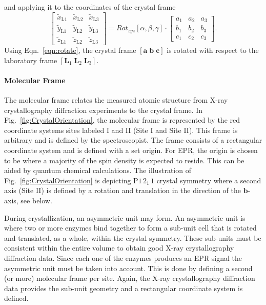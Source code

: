 and applying it to the coordinates of the crystal frame
\begin{equation}
 \begin{bmatrix}
  \tilde{x}_\text{L1} & \tilde{x}_\text{L2} & \tilde{x}_\text{L3} \\
  \tilde{y}_\text{L1} & \tilde{y}_\text{L2} & \tilde{y}_\text{L3} \\
  \tilde{z}_\text{L1} & \tilde{z}_\text{L2} & \tilde{z}_\text{L3} 
  \end{bmatrix} = Rot_{zyz}[\alpha, \beta, \gamma] \cdot \begin{bmatrix}
  a_1 & a_2 & a_3 \\
  b_1 & b_2 & b_3 \\
  c_1 & c_2 & c_3 
  \end{bmatrix}\label{eqn:rotate}.
\end{equation}
Using Eqn.~\ref{eqn:rotate}, the crystal frame $[\mathbf{a}\; \mathbf{b}\; \mathbf{c}]$ is rotated with respect to the laboratory frame $[\mathbf{L}_1\; \mathbf{L}_2\; \mathbf{L}_3]$. 

\paragraph*{Molecular Frame} The molecular frame relates the measured atomic structure from X-ray crystallography diffraction experiments to the crystal frame. In Fig.~\ref{fig:CrystalOrientation}, the molecular frame is represented by the red coordinate systems sites labeled I and II (Site I and Site II). This frame is arbitrary and is defined by the spectroscopist. The frame consists of a rectangular coordinate system and is defined with a set origin. For EPR, the origin is chosen to be where a majority of the spin density is expected to reside. This can be aided by quantum chemical calculations. The illustration of Fig.~\ref{fig:CrystalOrientation} is depicting P$1\,2_1\,1$ crystal symmetry where a second axis (Site II) is defined by a rotation and translation in the direction of the $\mathbf{b}$-axis, see below. 

During crystallization, an asymmetric unit may form. An asymmetric unit is where two or more enzymes bind together to form a sub-unit cell that is rotated and translated, as a whole, within the crystal symmetry. These sub-units must be consistent within the entire volume to obtain good X-ray crystallography diffraction data. Since each one of the enzymes produces an EPR signal the asymmetric unit must be taken into account. This is done by defining a second (or more) molecular frame per site. Again, the X-ray crystallography diffraction data provides the sub-unit geometry and a rectangular coordinate system is defined. 

